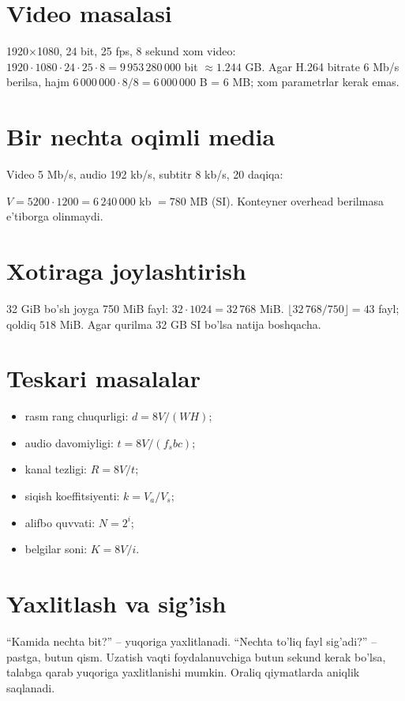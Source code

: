 \documentclass[11pt,a4paper,oneside]{book}
\newcommand{\formula}[1]{\begin{center}\tcboxmath[colback=GoldLight,colframe=Gold,boxrule=.7pt,arc=2mm]{#1}\end{center}}
\begin{document}
\section{Video masalasi}
\begin{examplebox}
1920×1080, 24 bit, 25 fps, 8 sekund xom video:
$1920\cdot1080\cdot24\cdot25\cdot8=9\,953\,280\,000$ bit $\approx1.244$ GB. Agar H.264 bitrate 6 Mb/s berilsa, hajm $6\,000\,000\cdot8/8=6\,000\,000$ B = 6 MB; xom parametrlar kerak emas.
\end{examplebox}

\section{Bir nechta oqimli media}
Video 5 Mb/s, audio 192 kb/s, subtitr 8 kb/s, 20 daqiqa:
\formula{R=5000+192+8=5200\ \text{kb/s}}
$V=5200\cdot1200=6\,240\,000$ kb $=780$ MB (SI). Konteyner overhead berilmasa e'tiborga olinmaydi.

\section{Xotiraga joylashtirish}
\begin{examplebox}
32 GiB bo'sh joyga 750 MiB fayl: $32\cdot1024=32\,768$ MiB. $\lfloor32\,768/750\rfloor=43$ fayl; qoldiq $518$ MiB. Agar qurilma 32 GB SI bo'lsa natija boshqacha.
\end{examplebox}

\section{Teskari masalalar}
\begin{itemize}
\item rasm rang chuqurligi: $d=8V/(WH)$;
\item audio davomiyligi: $t=8V/(f_sbc)$;
\item kanal tezligi: $R=8V/t$;
\item siqish koeffitsiyenti: $k=V_a/V_s$;
\item alifbo quvvati: $N=2^i$;
\item belgilar soni: $K=8V/i$.
\end{itemize}

\section{Yaxlitlash va sig'ish}
``Kamida nechta bit?'' -- yuqoriga yaxlitlanadi. ``Nechta to'liq fayl sig'adi?'' -- pastga, butun qism. Uzatish vaqti foydalanuvchiga butun sekund kerak bo'lsa, talabga qarab yuqoriga yaxlitlanishi mumkin. Oraliq qiymatlarda aniqlik saqlanadi.
\end{document}
